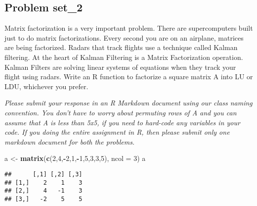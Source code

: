 \documentclass[]{article}
\newenvironment{Shaded}{\begin{snugshade}}{\end{snugshade}}
\newcommand{\DataTypeTok}[1]{\textcolor[rgb]{0.13,0.29,0.53}{#1}}
\newcommand{\DecValTok}[1]{\textcolor[rgb]{0.00,0.00,0.81}{#1}}
\newcommand{\KeywordTok}[1]{\textcolor[rgb]{0.13,0.29,0.53}{\textbf{#1}}}
\newcommand{\NormalTok}[1]{#1}
\newcommand{\OperatorTok}[1]{\textcolor[rgb]{0.81,0.36,0.00}{\textbf{#1}}}
\newcommand{\StringTok}[1]{\textcolor[rgb]{0.31,0.60,0.02}{#1}}
\begin{document}
\hypertarget{problem-set_2}{%
\subsection{Problem set\_2}\label{problem-set_2}}

Matrix factorization is a very important problem. There are
supercomputers built just to do matrix factorizations. Every second you
are on an airplane, matrices are being factorized. Radars that track
flights use a technique called Kalman filtering. At the heart of Kalman
Filtering is a Matrix Factorization operation. Kalman Filters are
solving linear systems of equations when they track your flight using
radars. Write an R function to factorize a square matrix A into LU or
LDU, whichever you prefer.

\emph{Please submit your response in an R Markdown document using our
class naming convention. You don't have to worry about permuting rows of
A and you can assume that A is less than 5x5, if you need to hard-code
any variables in your code. If you doing the entire assignment in R,
then please submit only one markdown document for both the problems.}

\begin{Shaded}
\begin{Highlighting}[]
\NormalTok{a <-}\StringTok{ }\KeywordTok{matrix}\NormalTok{(}\KeywordTok{c}\NormalTok{(}\DecValTok{2}\NormalTok{,}\DecValTok{4}\NormalTok{,}\OperatorTok{-}\DecValTok{2}\NormalTok{,}\DecValTok{1}\NormalTok{,}\OperatorTok{-}\DecValTok{1}\NormalTok{,}\DecValTok{5}\NormalTok{,}\DecValTok{3}\NormalTok{,}\DecValTok{3}\NormalTok{,}\DecValTok{5}\NormalTok{), }\DataTypeTok{ncol =} \DecValTok{3}\NormalTok{)}
\NormalTok{a}
\end{Highlighting}
\end{Shaded}

\begin{verbatim}
##      [,1] [,2] [,3]
## [1,]    2    1    3
## [2,]    4   -1    3
## [3,]   -2    5    5
\end{verbatim}
\end{document}

